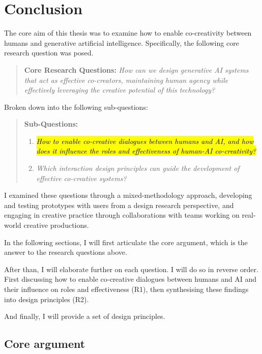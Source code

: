 \chapter[Conclusion]{Conclusion}\label{c:conclusion}

The core aim of this thesis was to examine how to enable co-creativity between humans and generative artificial intelligence. Specifically, the following core research question was posed. 

\begin{quote}
\textbf{Core Research Questions:}
\emph{How can we design generative AI systems that act as effective co-creators, maintaining human agency while effectively leveraging the creative potential of this technology?}
\end{quote}

Broken down into the following sub-questions: 

\begin{quote}
\textbf{Sub-Questions:}
\begin{enumerate}
    \item \emph{\hl{How to enable co-creative dialogues between humans and AI, and how does it influence the roles and effectiveness of human-AI co-creativity?}}
    \item \emph{Which interaction design principles can guide the development of effective co-creative systems?}
\end{enumerate}
\end{quote}


I examined these questions through a mixed-methodology approach, developing and testing prototypes with users from a design research perspective, and engaging in creative practice through collaborations with teams working on real-world creative productions.

In the following sections, I will first articulate the core argument, which is the answer to the research questions above. 

After than, I will elaborate further on each question. I will do so in reverse order. First discussing how to enable co-creative dialogues between humans and AI and their influence on roles and effectiveness (R1), then synthesising these findings into design principles (R2). 

And finally, I will provide a set of design principles. 

\section{Core argument}

